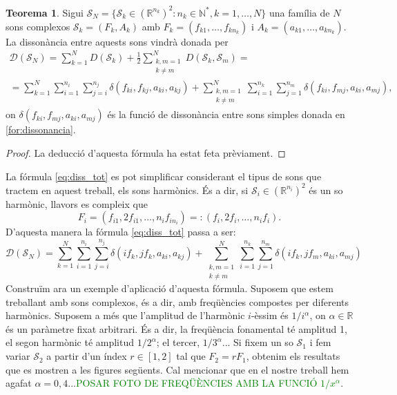 \documentclass{article}
\theoremstyle{definition}
\newtheorem{theorem}[definition]{Teorema}
\newcommand{\0}{\ensuremath{\vb{0}}}
\begin{document}
\begin{theorem}
Sigui $\mathcal{S}_N=\{\mathcal{S}_k\in(\mathbb{R}^{n_k})^2:n_k\in\mathbb{N}^*,k=1,\ldots, N\}$ una família de $N$ sons complexos $\mathcal{S}_k=(F_k, A_k)$ amb $F_k=(f_{k1},\ldots, f_{kn_k})$ i $A_k=(a_{k1},\ldots, a_{kn_k})$. La dissonància entre aquests sons vindrà donada per 
\begin{multline}
    \mathcal{D}(\mathcal{S}_N)=\sum_{k=1}^ND(\mathcal{S}_k)+\frac{1}{2}\sum_{\substack{k, m=1\\ k\ne m}}^ND(\mathcal{S}_k, \mathcal{S}_m)=\\=\sum_{k=1}^N\sum_{i=1}^{n_i}\sum_{j=i}^{n_j}\delta(f_{ki}, f_{kj}, a_{ki}, a_{kj})+\sum_{\substack{k, m=1\\ k\ne m}}^N\sum_{i=1}^{n_k}\sum_{j=1}^{n_m}\delta(f_{ki}, f_{mj}, a_{ki}, a_{mj}),
    \label{eq:diss_tot}
\end{multline}
on $\delta(f_{ki}, f_{mj}, a_{ki}, a_{mj})$ és la funció de dissonància entre sons simples donada en \eqref{for:dissonancia}.
\end{theorem}
\begin{proof}
La deducció d'aquesta fórmula ha estat feta prèviament.
\end{proof}
La fórmula \eqref{eq:diss_tot} es pot simplificar considerant el tipus de sons que tractem en aquest treball, els sons harmònics. És a dir, si $\mathcal{S}_i\in(\mathbb{R}^{n_i})^2$ és un so harmònic, llavors es compleix que $$F_i=(f_{i1},2f_{i1},\ldots, n_if_{in_i})=:(f_i,2f_i,\ldots, n_if_i).$$ D'aquesta manera la fórmula \eqref{eq:diss_tot} passa a ser: 
\begin{equation}
    \mathcal{D}(\mathcal{S}_N)=\sum_{k=1}^N\sum_{i=1}^{n_i}\sum_{j=i}^{n_j}\delta(if_k, jf_k, a_{ki}, a_{kj})+\sum_{\substack{k, m=1\\ k\ne m}}^N\sum_{i=1}^{n_k}\sum_{j=1}^{n_m}\delta(if_k, jf_m, a_{ki}, a_{mj})
\end{equation}
Construïm ara un exemple d'aplicació d'aquesta fórmula. Suposem que estem treballant amb sons complexos, és a dir, amb freqüències compostes per diferents harmònics. Suposem a més que l'amplitud de l'harmònic $i$-èssim és $1/i^\alpha$, on $\alpha\in\mathbb{R}$ és un paràmetre fixat arbitrari. És a dir, la freqüència fonamental té amplitud 1, el segon harmònic té amplitud $1/2^\alpha$; el tercer, $1/3^\alpha$... Si fixem un so $\mathcal{S}_1$ i fem variar $\mathcal{S}_2$ a partir d'un índex $r\in[1,2]$ tal que $F_2=rF_1$, obtenim els resultats que es mostren a les figures següents. Cal mencionar que en el nostre treball hem agafat $\alpha=0,4$...\textcolor{green}{POSAR FOTO DE FREQÜÈNCIES AMB LA FUNCIÓ $1/x^\alpha$}.
\end{document}
